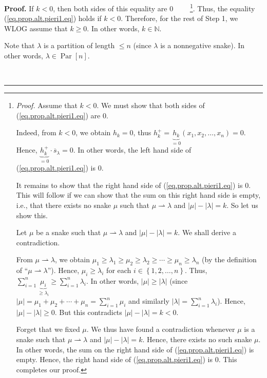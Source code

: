 \documentclass[numbers=enddot,12pt,final,onecolumn,notitlepage]{scrartcl}%
\theoremstyle{definition}
\newenvironment{proof}[1][Proof]{\noindent\textbf{#1.} }{\ \rule{0.5em}{0.5em}}
\let\sumnonlimits\sum
\renewcommand{\sum}{\sumnonlimits\limits}
\begin{document}
\begin{proof}
If $k<0$, then both sides of this equality are $0$%
\ \ \ \ \footnote{\textit{Proof.} Assume that $k<0$. We must show that both
sides of (\ref{eq.prop.alt.pieri1.eq}) are $0$.
\par
Indeed, from $k<0$, we obtain $h_{k}=0$, thus $h_{k}^{+}=\underbrace{h_{k}%
}_{=0}\left(  x_{1},x_{2},\ldots,x_{n}\right)  =0$. Hence, $\underbrace{h_{k}%
^{+}}_{=0}\cdot\overline{s}_{\lambda}=0$. In other words, the left hand side
of (\ref{eq.prop.alt.pieri1.eq}) is $0$.
\par
It remains to show that the right hand side of (\ref{eq.prop.alt.pieri1.eq})
is $0$. This will follow if we can show that the sum on this right hand side
is empty, i.e., that there exists no snake $\mu$ such that $\mu\rightharpoonup
\lambda$ and $\left\vert \mu\right\vert -\left\vert \lambda\right\vert =k$. So
let us show this.
\par
Let $\mu$ be a snake such that $\mu\rightharpoonup\lambda$ and $\left\vert
\mu\right\vert -\left\vert \lambda\right\vert =k$. We shall derive a
contradiction.
\par
From $\mu\rightharpoonup\lambda$, we obtain $\mu_{1}\geq\lambda_{1}\geq\mu
_{2}\geq\lambda_{2}\geq\cdots\geq\mu_{n}\geq\lambda_{n}$ (by the definition of
\textquotedblleft$\mu\rightharpoonup\lambda$\textquotedblright). Hence,
$\mu_{i}\geq\lambda_{i}$ for each $i\in\left\{  1,2,\ldots,n\right\}  $. Thus,
$\sum_{i=1}^{n}\underbrace{\mu_{i}}_{\geq\lambda_{i}}\geq\sum_{i=1}^{n}%
\lambda_{i}$. In other words, $\left\vert \mu\right\vert \geq\left\vert
\lambda\right\vert $ (since $\left\vert \mu\right\vert =\mu_{1}+\mu_{2}%
+\cdots+\mu_{n}=\sum_{i=1}^{n}\mu_{i}$ and similarly $\left\vert
\lambda\right\vert =\sum_{i=1}^{n}\lambda_{i}$). Hence, $\left\vert
\mu\right\vert -\left\vert \lambda\right\vert \geq0$. But this contradicts
$\left\vert \mu\right\vert -\left\vert \lambda\right\vert =k<0$.
\par
Forget that we fixed $\mu$. We thus have found a contradiction whenever $\mu$
is a snake such that $\mu\rightharpoonup\lambda$ and $\left\vert
\mu\right\vert -\left\vert \lambda\right\vert =k$. Hence, there exists no such
snake $\mu$. In other words, the sum on the right hand side of
(\ref{eq.prop.alt.pieri1.eq}) is empty. Hence, the right hand side of
(\ref{eq.prop.alt.pieri1.eq}) is $0$. This completes our proof.}. Thus, the
equality (\ref{eq.prop.alt.pieri1.eq}) holds if $k<0$. Therefore, for the rest
of Step 1, we WLOG assume that $k\geq0$. In other words, $k\in\mathbb{N}$.

Note that $\lambda$ is a partition of length $\leq n$ (since $\lambda$ is a
nonnegative snake). In other words, $\lambda\in\operatorname*{Par}\left[
n\right]  $.


\end{proof}
\end{document}

